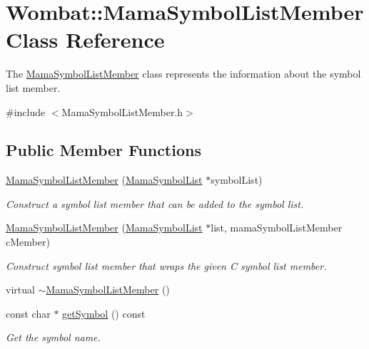 \hypertarget{classWombat_1_1MamaSymbolListMember}{
\section{Wombat::MamaSymbolListMember Class Reference}
\label{classWombat_1_1MamaSymbolListMember}
}


The \hyperlink{classWombat_1_1MamaSymbolListMember}{MamaSymbolListMember} class represents the information about the symbol list member.  


{\ttfamily \#include $<$MamaSymbolListMember.h$>$}\subsection*{Public Member Functions}
\begin{DoxyCompactItemize}
\item 
\hyperlink{classWombat_1_1MamaSymbolListMember_a503f49ff8ce5cfa1033bb2bd4017c972}{MamaSymbolListMember} (\hyperlink{classWombat_1_1MamaSymbolList}{MamaSymbolList} $\ast$symbolList)
\begin{DoxyCompactList}\small\item\em Construct a symbol list member that can be added to the symbol list. \item\end{DoxyCompactList}\item 
\hyperlink{classWombat_1_1MamaSymbolListMember_aea2ddcc6a239f32e6b0355ec558d17f7}{MamaSymbolListMember} (\hyperlink{classWombat_1_1MamaSymbolList}{MamaSymbolList} $\ast$list, mamaSymbolListMember cMember)
\begin{DoxyCompactList}\small\item\em Construct symbol list member that wraps the given C symbol list member. \item\end{DoxyCompactList}\item 
virtual \hyperlink{classWombat_1_1MamaSymbolListMember_ad80425b19885b827573ba955e232f177}{$\sim$MamaSymbolListMember} ()
\item 
const char $\ast$ \hyperlink{classWombat_1_1MamaSymbolListMember_a1135197846cf6490585c3df77ea63274}{getSymbol} () const 
\begin{DoxyCompactList}\small\item\em Get the symbol name. \item\end{DoxyCompactList}\item 

\end{DoxyCompactItemize}
